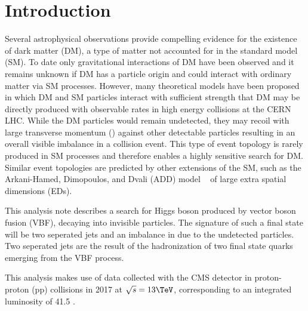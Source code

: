 \section{Introduction} \label{section:introduction}

Several astrophysical observations \cite{Bertone:2004pz,Feng:2010gw,Porter:2011nv} 
provide compelling evidence for the existence of
dark matter (DM), a type of matter not accounted for in the standard model (SM).
To date only gravitational interactions of DM have been observed and it remains unknown
if DM has a particle origin and could interact with ordinary matter via SM processes. However,
many theoretical models have been proposed in which DM and SM
particles interact with sufficient strength that DM may be directly produced with
observable rates in high energy collisions at the CERN LHC.
While the DM particles would remain undetected, they may recoil
with large transverse momentum (\pt) against other detectable particles
resulting in an overall visible \pt imbalance in a collision event. This type of event topology is
rarely produced in SM processes and therefore enables a highly sensitive search 
for DM. Similar event topologies are predicted by other extensions of the SM, 
such as the Arkani-Hamed, Dimopoulos, and Dvali (ADD)
model ~\cite{bib:ADD1,ADDPRD,Antoniadis,ADDGiudice,ADDPeskin} of large extra spatial dimensions (EDs).

This analysis note describes a search for Higgs boson produced by vector boson fusion (VBF), 
decaying into invisible particles. The signature of such a final state will be two seperated jets 
and an imbalance in \vpt due to the undetected particles. Two seperated jets are the result of the 
hadronization of two final state quarks emerging from the VBF process.

This analysis makes use of data collected with the CMS detector in proton-proton (pp) collisions in 2017 
at $\sqrt{s}=13\TeV$, corresponding to an integrated luminosity of 41.5 \fbinv. 


